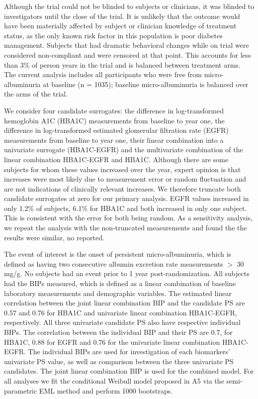 \documentclass[times, doublespace]{simauth}
\begin{document}
Although the trial could not be blinded to subjects or clinicians, it was blinded to investigators until the close of the trial. It is unlikely that the outcome would have been materially affected by subject or clinician knowledge of treatment status, as the only known risk factor in this population is poor diabetes management. Subjects that had dramatic behavioral changes while on trial were considered non-compliant and were censored at that point. This accounts for less than 3\% of person years in the trial and is balanced between treatment arms. The current analysis includes all participants who were free from micro-albuminuria at baseline (n = 1035); baseline micro-albuminuria is balanced over the arms of the trial. 

We consider four candidate surrogates: the difference in log-transformed hemoglobin A1C (HBA1C) measurements from baseline to year one, the difference in log-transformed estimated glomerular filtration rate (EGFR) measurements from baseline to year one, their linear combination into a univariate surrogate (HBA1C-EGFR) and the multivariate combination of the linear combination HBA1C-EGFR and HBA1C. Although there are some subjects for whom these values increased over the year, expert opinion is that increases were most likely due to measurement error or random fluctuation and are not indications of clinically relevant increases. We therefore truncate both candidate surrogates at zero for our primary analysis. EGFR values increased in only 1.2\% of subjects, 6.1\% for HBA1C and both increased in only one subject. This is consistent with the error for both being random. As a sensitivity analysis, we repeat the analysis with the non-truncated measurements and found the the results were similar, no reported. 

The event of interest is the onset of persistent micro-albuminuria, which is defined as having two consecutive albumin excretion rate measurements $>$ 30 mg/g. No subjects had an event prior to 1 year post-randomization. All subjects had the BIPs measured, which is defined as a linear combination of baseline laboratory measurements and demographic variables. The estimated linear correlation between the joint linear combination BIP and the candidate PS are 0.57 and 0.76 for HBA1C and univariate linear combination HBA1C-EGFR, respectively. All three univariate candidate PS also have respective individual BIPs. The correlation between the individual BIP and their PS are 0.7, for HBA1C, 0.88 for EGFR and 0.76 for the univariate linear combination HBA1C-EGFR. The individual BIPs are used for investigation of each biomarkers' univariate PS value, as well as comparison between the three univariate PS candidates. The joint linear combination BIP is used for the combined model. For all analyses we fit the conditional Weibull model proposed in A5 via the semi-parametric EML method and perform 1000 bootstraps. 
\end{document}
